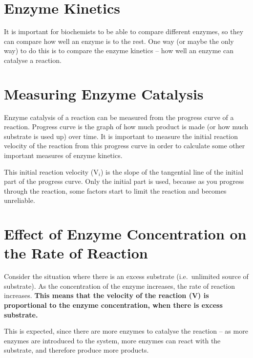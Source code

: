 \section{Enzyme Kinetics}

It is important for biochemists to be able to compare different enzymes, so they can compare how well an enzyme is to the rest.
One way (or maybe the only way) to do this is to compare the enzyme kinetics -- how well an enzyme can catalyse a reaction.

\section{Measuring Enzyme Catalysis}

\begin{center}
\end{center}

Enzyme catalysis of a reaction can be measured from the progress curve of a reaction.
Progress curve is the graph of how much product is made (or how much substrate is used up) over time.
It is important to measure the initial reaction velocity of the reaction from this progress curve in order to calculate some other important measures of enzyme kinetics.

This initial reaction velocity (V$_i$) is the slope of the tangential line of the initial part of the progress curve.
Only the initial part is used, because as you progress through the reaction, some factors start to limit the reaction and becomes unreliable.

\section{Effect of Enzyme Concentration on the Rate of Reaction}

\begin{center}
\end{center}

Consider the situation where there is an excess substrate (i.e.\ unlimited source of substrate).
As the concentration of the enzyme increases, the rate of reaction increases.
\textbf{This means that the velocity of the reaction (V) is proportional to the enzyme concentration, when there is excess substrate.}

This is expected, since there are more enzymes to catalyse the reaction -- as more enzymes are introduced to the system, more enzymes can react with the substrate, and therefore produce more products.

